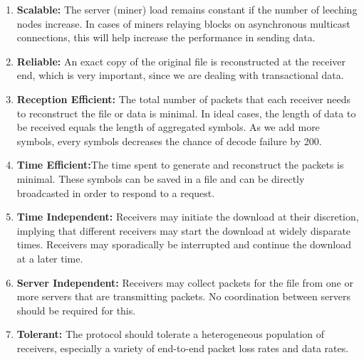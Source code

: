 \begin{enumerate}
    \item \textbf{Scalable:} The server (miner) load remains constant if the
        number of leeching nodes increase. In cases of miners relaying blocks on
        asynchronous multicast connections, this will help increase the
        performance in sending data.
    \item \textbf{Reliable:} An exact copy of the original file is reconstructed
        at the receiver end, which is very important, since we are dealing with
        transactional data. 
    \item \textbf{Reception Efficient:} The total number of packets that each
        receiver needs to reconstruct  the file or data is minimal. In ideal
        cases, the length of data to be received equals the length of aggregated
        symbols. As we add more symbols, every symbols decreases the chance of
        decode failure by 200.
    \item \textbf{Time Efficient:}The time spent to generate and reconstruct the
        packets is minimal. These symbols can be saved in a file and can be
        directly broadcasted in order to respond to a request.
    \item \textbf{Time Independent:} Receivers may initiate the download at their
        discretion, implying that different receivers may start the download at
        widely disparate times. Receivers may sporadically be interrupted and
        continue the download at a later time.
    \item \textbf{Server Independent:} Receivers may collect packets for the
        file  from  one  or  more  servers  that  are  transmitting packets. No
        coordination between servers should be required for this.
    \item \textbf{Tolerant:} The protocol should tolerate a heterogeneous
        population of receivers, especially a variety of end-to-end packet loss
        rates and data rates.
\end{enumerate}

